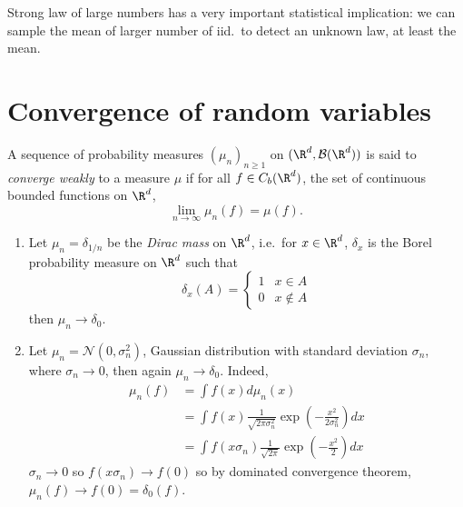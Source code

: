 \documentclass[a4paper]{article}
\begin{document}
Strong law of large numbers has a very important statistical implication: we can sample the mean of larger number of iid.\ to detect an unknown law, at least the mean.

\section{Convergence of random variables}

\begin{definition}
  A sequence of probability measures \((\mu_n)_{n \geq 1}\) on \((\R^d, \mathcal B(\R^d))\) is said to \emph{converge weakly} to a measure \(\mu\) if for all \(f \in C_b(\R^d)\), the set of continuous bounded functions on \(\R^d\),
  \[
    \lim_{n \to \infty} \mu_n(f) = \mu(f).
  \]
\end{definition}

\begin{eg}\leavevmode
  \begin{enumerate}
  \item Let \(\mu_n = \delta_{1/n}\) be the \emph{Dirac mass} on \(\R^d\), i.e.\ for \(x \in \R^d\), \(\delta_x\) is the Borel probability measure on \(\R^d\) such that
    \[
      \delta_x(A) =
      \begin{cases}
        1 & x \in A \\
        0 & x \notin A
      \end{cases}
    \]
    then \(\mu_n \to \delta_0\).
  \item Let \(\mu_n = \mathcal N(0, \sigma_n^2)\), Gaussian distribution with standard deviation \(\sigma_n\), where \(\sigma_n \to 0\), then again \(\mu_n \to \delta_0\). Indeed,
    \begin{align*}
      \mu_n(f)
      &= \int f(x) d\mu_n(x) \\
      &= \int f(x) \frac{1}{\sqrt{2\pi \sigma_n^2}} \exp (- \frac{x^2}{2\sigma_n^2}) dx \\
      &= \int f(x\sigma_n) \frac{1}{\sqrt{2\pi}} \exp (- \frac{x^2}{2}) dx
    \end{align*}
    \(\sigma_n \to 0\) so \(f(x\sigma_n) \to f(0)\) so by dominated convergence theorem, \(\mu_n(f) \to f(0) = \delta_0(f)\).
  \end{enumerate}
\end{eg}
\end{document}

